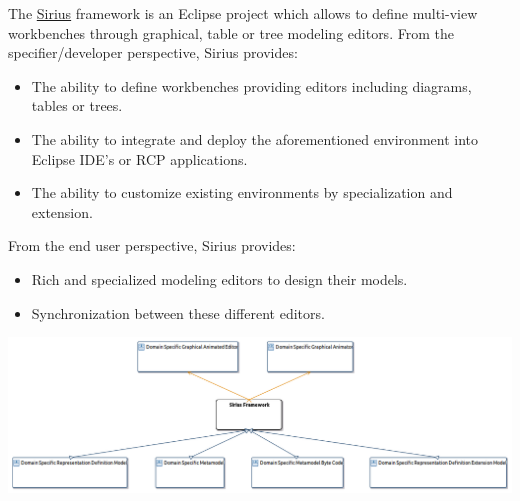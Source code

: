 \documentclass{gemoc} %
\begin{document}
The \href{http://www.eclipse.org/proposals/modeling.sirius/}{Sirius} framework is an Eclipse project which allows to define multi-view workbenches through graphical, table or tree modeling editors.
From the specifier/developer perspective, Sirius provides:
\begin{itemize}
\item The ability to define workbenches providing editors including diagrams, tables or trees.
\item The ability to integrate and deploy the aforementioned environment into Eclipse IDE's or RCP applications.
\item The ability to customize existing environments by specialization and extension.
\end{itemize}
From the end user perspective, Sirius provides:
\begin{itemize}
\item Rich and specialized modeling editors to design their models.
\item Synchronization between these different editors.
\end{itemize}
\begin{center}
\includegraphics*[trim=0.0cm 0.0cm 0cm 0.0cm, clip=true]{../images/generated/Generated_Sirius_Framework.png}
\end{center}
\end{document}
